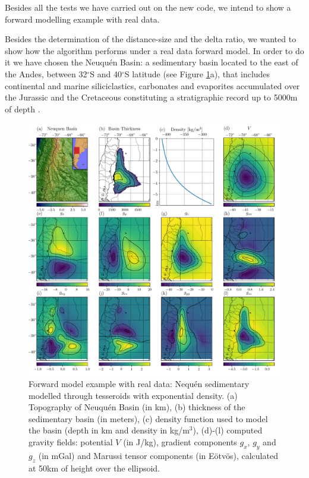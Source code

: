 \documentclass[extra]{gji}
\begin{document}
Besides all the tests we have carried out on the new code, we intend to show a 
forward modelling example with real data.

Besides the determination of the distance-size and the delta ratio, we 
wanted to show how the algorithm performs under a real data forward model.
In order to do it we have chosen the Neuqu\'en Basin: a sedimentary basin 
located to the east of the Andes, between 32$^\circ$S and 40$^\circ$S latitude 
(see Figure \ref{fig:neuquen-basin}a), that includes continental and marine 
siliciclastics, carbonates and evaporites accumulated over the Jurassic and 
the Cretaceous constituting a stratigraphic record up to 5000m of depth 
\citep{Howell2005}.

\begin{figure}
\centering
\includegraphics[width=\linewidth]{figures/neuquen-basin.pdf}
\caption{
    Forward model example with real data: Nequ\'en sedimentary modelled 
    through tesseroids with exponential density.
    (a) Topography of Neuqu\'en Basin (in km),
    (b) thickness of the sedimentary basin (in meters),
    (c) density function used to model the basin (depth in km and density in 
    kg/m$^3$),
    (d)-(l) computed gravity fields: potential $V$ (in J/kg), gradient 
    components $g_x$, $g_y$ and $g_z$ (in mGal) and Marussi tensor components 
    (in Eötvös), calculated at 50km of height over the ellipsoid.}
\label{fig:neuquen-basin}
\end{figure}
\end{document}
